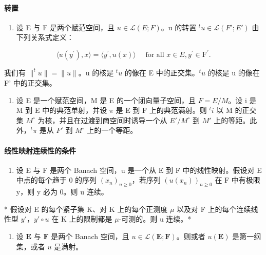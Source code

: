 \paragraph{转置}

\begin{enumerate}
\def\labelenumi{\arabic{enumi})}
\setcounter{enumi}{8}
\tightlist
\item
  设 E 与 F 是两个赋范空间，且 \(u \in \mathcal{L}(E; F)\)。u 的转置 \(^{t}u \in \mathcal{L}(F'; E')\) 由下列关系式定义：
\end{enumerate}

\[
\langle u (y ^ {\prime}), x \rangle = \langle y ^ {\prime}, u (x) \rangle \quad \text {   for   all   } x \in E, y ^ {\prime} \in \mathrm{F} ^ {\prime}.\tag{6}
\]

我们有 \(\|^{t}u\| = \|u\|\)。u 的核是 \(^{t}u\) 的像在 E 中的正交集。\(^{t}u\) 的核是 u 的像在 F' 中的正交集。

\begin{enumerate}
\def\labelenumi{\arabic{enumi})}
\setcounter{enumi}{9}
\tightlist
\item
  设 E 是一个赋范空间，M 是 E 的一个闭向量子空间，且 \(F = E/M\)。设 i 是 M 到 E 中的典范单射，并设 \(\pi\) 是 E 到 F 上的典范满射。则 \(^{t}i\) 以 M 的正交集 \(M^{\circ}\) 为核，并且在过渡到商空间时诱导一个从 \(E'/M^{\circ}\) 到 \(M'\) 上的等距。此外，\(^{t}\pi\) 是从 \(F'\) 到 \(M^{\circ}\) 上的一个等距。
\end{enumerate}

\paragraph{线性映射连续性的条件}

\begin{enumerate}
\def\labelenumi{\arabic{enumi})}
\setcounter{enumi}{10}
\tightlist
\item
  设 E 与 F 是两个 Banach 空间，u 是一个从 E 到 F 中的线性映射。假设对 E 中点的每个趋于 0 的序列 \((x_{n})_{n\geqslant0}\)，若序列 \((u(x_{n}))_{n\geqslant0}\) 在 F 中有极限 y，则 y 必为 0。则 u 连续。
\end{enumerate}

* 假设对 E 的每个紧子集 K、对 K 上的每个正测度 \(\mu\) 以及对 F 上的每个连续线性型 \(y'\)，\(y' \circ u\) 在 K 上的限制都是 \(\mu\)-可测的。则 u 连续。*

\begin{enumerate}
\def\labelenumi{\arabic{enumi})}
\setcounter{enumi}{11}
\tightlist
\item
  设 \(\mathbf{E}\) 与 \(\mathbf{F}\) 是两个 Banach 空间，且 \(u \in \mathcal{L}(\mathbf{E};\mathbf{F})\)。则或者 \(u(\mathbf{E})\) 是第一纲集，或者 \(u\) 是满射。
\end{enumerate}


